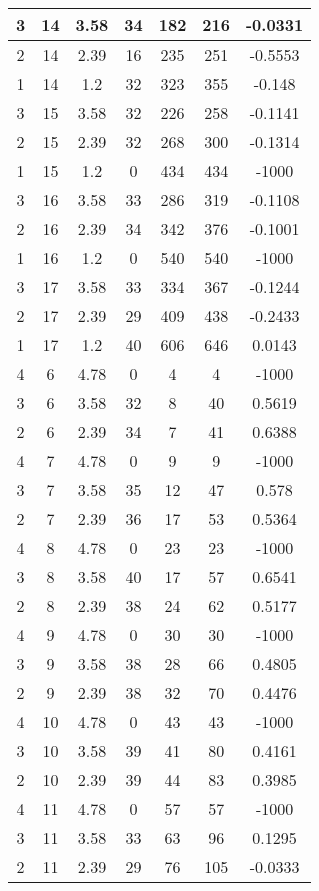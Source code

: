 \documentclass[letterpaper, 12pt]{article}
\begin{document}
\begin{longtable}{|c|c|c|c|c|c|c|}
\hline
3 & 14 & 3.58 & 34 & 182 & 216 & -0.0331 \\
\hline
2 & 14 & 2.39 & 16 & 235 & 251 & -0.5553 \\
\hline
1 & 14 & 1.2 & 32 & 323 & 355 & -0.148 \\
\hline
3 & 15 & 3.58 & 32 & 226 & 258 & -0.1141 \\
\hline
2 & 15 & 2.39 & 32 & 268 & 300 & -0.1314 \\
\hline
1 & 15 & 1.2 & 0 & 434 & 434 & -1000 \\
\hline
3 & 16 & 3.58 & 33 & 286 & 319 & -0.1108 \\
\hline
2 & 16 & 2.39 & 34 & 342 & 376 & -0.1001 \\
\hline
1 & 16 & 1.2 & 0 & 540 & 540 & -1000 \\
\hline
3 & 17 & 3.58 & 33 & 334 & 367 & -0.1244 \\
\hline
2 & 17 & 2.39 & 29 & 409 & 438 & -0.2433 \\
\hline
1 & 17 & 1.2 & 40 & 606 & 646 & 0.0143 \\
\hline
4 & 6 & 4.78 & 0 & 4 & 4 & -1000 \\
\hline
3 & 6 & 3.58 & 32 & 8 & 40 & 0.5619 \\
\hline
2 & 6 & 2.39 & 34 & 7 & 41 & 0.6388 \\
\hline
4 & 7 & 4.78 & 0 & 9 & 9 & -1000 \\
\hline
3 & 7 & 3.58 & 35 & 12 & 47 & 0.578 \\
\hline
2 & 7 & 2.39 & 36 & 17 & 53 & 0.5364 \\
\hline
4 & 8 & 4.78 & 0 & 23 & 23 & -1000 \\
\hline
3 & 8 & 3.58 & 40 & 17 & 57 & 0.6541 \\
\hline
2 & 8 & 2.39 & 38 & 24 & 62 & 0.5177 \\
\hline
4 & 9 & 4.78 & 0 & 30 & 30 & -1000 \\
\hline
3 & 9 & 3.58 & 38 & 28 & 66 & 0.4805 \\
\hline
2 & 9 & 2.39 & 38 & 32 & 70 & 0.4476 \\
\hline
4 & 10 & 4.78 & 0 & 43 & 43 & -1000 \\
\hline
3 & 10 & 3.58 & 39 & 41 & 80 & 0.4161 \\
\hline
2 & 10 & 2.39 & 39 & 44 & 83 & 0.3985 \\
\hline
4 & 11 & 4.78 & 0 & 57 & 57 & -1000 \\
\hline
3 & 11 & 3.58 & 33 & 63 & 96 & 0.1295 \\
\hline
2 & 11 & 2.39 & 29 & 76 & 105 & -0.0333 \\

\end{longtable}
\end{document}
